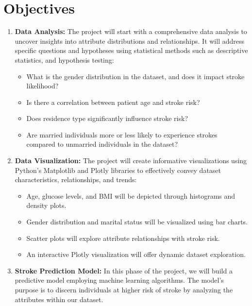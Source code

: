 \documentclass{article}
\begin{document}
\section*{Objectives}
\begin{enumerate}
    \item \textbf{Data Analysis:} The project will start with a comprehensive data analysis to uncover insights into attribute distributions and relationships. It will address specific questions and hypotheses using statistical methods such as descriptive statistics, and hypothesis testing:
    \begin{itemize}
        \item What is the gender distribution in the dataset, and does it impact stroke likelihood?
        \item Is there a correlation between patient age and stroke risk?
        \item Does residence type significantly influence stroke risk?
        \item Are married individuals more or less likely to experience strokes compared to unmarried individuals in the dataset?
    \end{itemize}
    
    \item \textbf{Data Visualization:} The project will create informative visualizations using Python's Matplotlib and Plotly libraries to effectively convey dataset characteristics, relationships, and trends:
    \begin{itemize}
        \item Age, glucose levels, and BMI will be depicted through histograms and density plots.
        \item Gender distribution and marital status will be visualized using bar charts.
        \item Scatter plots will explore attribute relationships with stroke risk.
        \item An interactive Plotly visualization will offer dynamic dataset exploration.
    \end{itemize}
    
    \item \textbf{Stroke Prediction Model:} In this phase of the project, we will build a predictive model employing machine learning algorithms. The model's purpose is to discern individuals at higher risk of stroke by analyzing the attributes within our dataset.
\end{enumerate}
\end{document}
